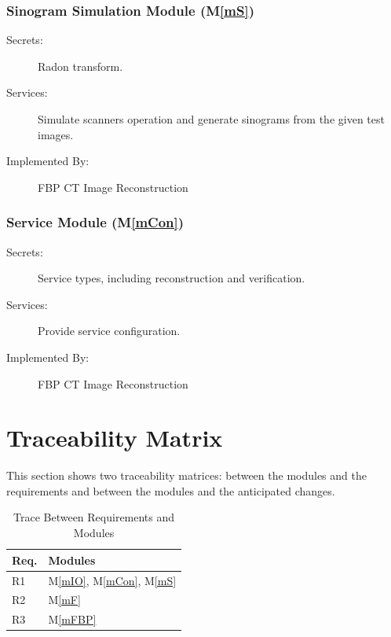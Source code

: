 \documentclass[12pt, titlepage]{article}
\newcommand{\mref}[1]{M\ref{#1}}
\begin{document}
\subsubsection{Sinogram Simulation Module (\mref{mS})}

\begin{description}
\item[Secrets:] Radon transform.
\item[Services:] Simulate scanners operation and generate sinograms from the given test images.
\item[Implemented By:] FBP CT Image Reconstruction
\end{description}

\subsubsection{Service Module (\mref{mCon})}

\begin{description}
\item[Secrets:] Service types, including reconstruction and verification.
\item[Services:] Provide service configuration.
\item[Implemented By:] FBP CT Image Reconstruction
\end{description}

\section{Traceability Matrix} \label{SecTM}

This section shows two traceability matrices: between the modules and the
requirements and between the modules and the anticipated changes.

\begin{table}[H]
\centering
\begin{tabular}{p{} p{}}
\toprule
\textbf{Req.} & \textbf{Modules}\\
\midrule
R1 & \mref{mIO}, \mref{mCon}, \mref{mS}\\
R2 & \mref{mF}\\
R3 & \mref{mFBP}\\
\bottomrule
\end{tabular}
\caption{Trace Between Requirements and Modules}
\label{TblRT}
\end{table}
\end{document}
